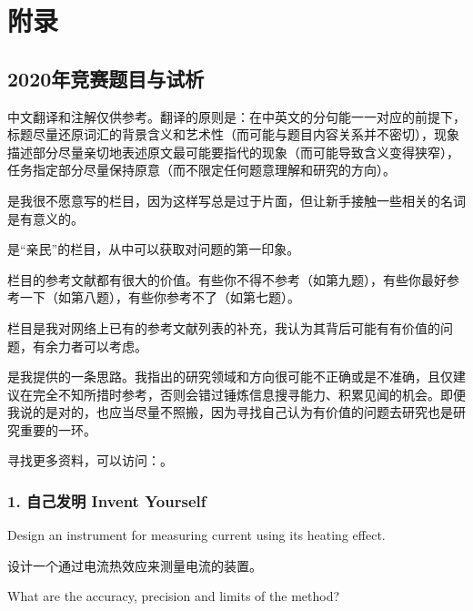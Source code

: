 \documentclass[a4paper,10pt,english]{sphinxmanual}
\begin{document}


\chapter{附录}
\label{\detokenize{7. Appendix::doc}}\label{\detokenize{7. Appendix:id1}}

\section{2020年竞赛题目与试析}
\label{\detokenize{7. Appendix:id2}}
中文翻译和注解仅供参考。翻译的原则是：在中英文的分句能一一对应的前提下，标题尽量还原词汇的背景含义和艺术性（而可能与题目内容关系并不密切），现象描述部分尽量亲切地表述原文最可能要指代的现象（而可能导致含义变得狭窄），任务指定部分尽量保持原意（而不限定任何题意理解和研究的方向）。

 是我很不愿意写的栏目，因为这样写总是过于片面，但让新手接触一些相关的名词是有意义的。

 是“亲民”的栏目，从中可以获取对问题的第一印象。

 栏目的参考文献都有很大的价值。有些你不得不参考（如第九题），有些你最好参考一下（如第八题），有些你参考不了（如第七题）。

 栏目是我对网络上已有的参考文献列表的补充，我认为其背后可能有有价值的问题，有余力者可以考虑。

 是我提供的一条思路。我指出的研究领域和方向很可能不正确或是不准确，且仅建议在完全不知所措时参考，否则会错过锤炼信息搜寻能力、积累见闻的机会。即便我说的是对的，也应当尽量不照搬，因为寻找自己认为有价值的问题去研究也是研究重要的一环。

寻找更多资料，可以访问：。


\subsection{1. 自己发明 Invent Yourself}
\label{\detokenize{7. Appendix:invent-yourself}}
Design an instrument for measuring current using its heating effect.

设计一个通过电流热效应来测量电流的装置。

What are the accuracy, precision and limits of the method?
\end{document}
